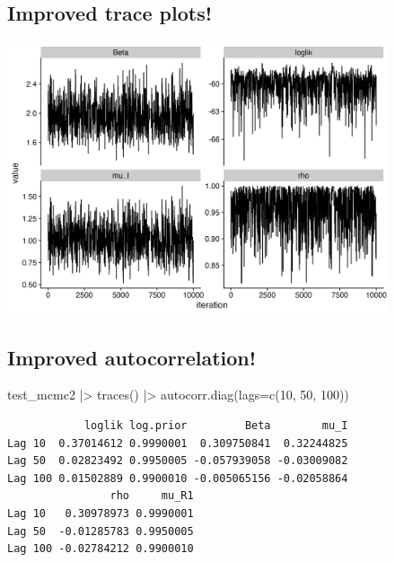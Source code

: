 \documentclass[
  letterpaper,
  DIV=11,
  numbers=noendperiod]{scrartcl}
\newenvironment{Shaded}{\begin{snugshade}}{\end{snugshade}}
\newcommand{\AttributeTok}[1]{\textcolor[rgb]{0.40,0.45,0.13}{#1}}
\newcommand{\DecValTok}[1]{\textcolor[rgb]{0.68,0.00,0.00}{#1}}
\newcommand{\FunctionTok}[1]{\textcolor[rgb]{0.28,0.35,0.67}{#1}}
\newcommand{\NormalTok}[1]{\textcolor[rgb]{0.00,0.23,0.31}{#1}}
\newcommand{\SpecialCharTok}[1]{\textcolor[rgb]{0.37,0.37,0.37}{#1}}
\begin{document}
\hypertarget{improved-trace-plots}{%
\subsection{Improved trace plots!}\label{improved-trace-plots}}

\begin{center}
  \includegraphics[height=8cm]{../graphics/test-mcmc-trace2.png}
\end{center}

\hypertarget{improved-autocorrelation}{%
\subsection{Improved autocorrelation!}\label{improved-autocorrelation}}

\begin{Shaded}
\begin{Highlighting}[]
\NormalTok{test\_mcmc2 }\SpecialCharTok{|\textgreater{}} 
  \FunctionTok{traces}\NormalTok{() }\SpecialCharTok{|\textgreater{}}  
  \FunctionTok{autocorr.diag}\NormalTok{(}\AttributeTok{lags=}\FunctionTok{c}\NormalTok{(}\DecValTok{10}\NormalTok{, }\DecValTok{50}\NormalTok{, }\DecValTok{100}\NormalTok{))}
\end{Highlighting}
\end{Shaded}

\begin{verbatim}
            loglik log.prior         Beta        mu_I
Lag 10  0.37014612 0.9990001  0.309750841  0.32244825
Lag 50  0.02823492 0.9950005 -0.057939058 -0.03009082
Lag 100 0.01502889 0.9900010 -0.005065156 -0.02058864
                rho     mu_R1
Lag 10   0.30978973 0.9990001
Lag 50  -0.01285783 0.9950005
Lag 100 -0.02784212 0.9900010
\end{verbatim}
\end{document}
